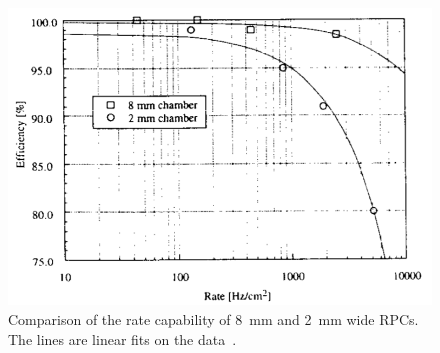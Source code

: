 	\begin{figure}[H]
		\centering
		\includegraphics[width = 0.7\plotwidth]{fig/chapt4/Gap-width-rate-cap.png}
		\caption{\label{fig:GapWidthRate} Comparison of the rate capability of \SI{8}{mm} and \SI{2}{mm} wide RPCs. The lines are linear fits on the data~\cite{ZEBALLOS96COMP}.}
	\end{figure}
	
